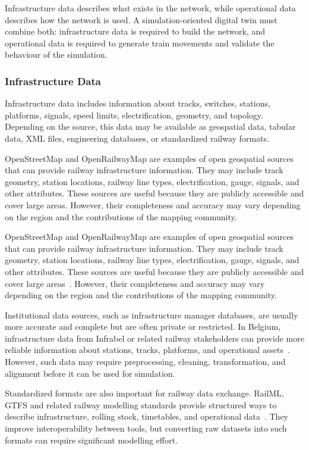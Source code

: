 Infrastructure data describes what exists in the network, while operational data describes how the network is used. A 
simulation-oriented digital twin must combine both: infrastructure data is required to build the network, and operational 
data is required to generate train movements and validate the behaviour of the simulation.

\subsubsection{Infrastructure Data}
Infrastructure data includes information about tracks, switches, stations, platforms, signals, speed limits, 
electrification, geometry, and topology. Depending on the source, this data may be available as geospatial data, tabular 
data, XML files, engineering databases, or standardized railway formats.

OpenStreetMap and OpenRailwayMap are examples of open geospatial sources that can provide railway infrastructure 
information. They may include track geometry, station locations, railway line types, electrification, gauge, signals, and 
other attributes. These sources are useful because they are publicly accessible and cover large areas. However, their 
completeness and accuracy may vary depending on the region and the contributions of the mapping community.

OpenStreetMap and OpenRailwayMap are examples of open geospatial sources that can provide railway infrastructure 
information. They may include track geometry, station locations, railway line types, electrification, gauge, signals, and 
other attributes. These sources are useful because they are publicly accessible and cover large areas~\cite{osm}. However, 
their completeness and accuracy may vary depending on the region and the contributions of the mapping community.

Institutional data sources, such as infrastructure manager databases, are usually more accurate and complete but are often 
private or restricted. In Belgium, infrastructure data from Infrabel or related railway stakeholders can provide more 
reliable information about stations, tracks, platforms, and operational assets~\cite{infrabel_open_data}. However, such 
data may require preprocessing, cleaning, transformation, and alignment before it can be used for simulation.

Standardized formats are also important for railway data exchange. RailML, GTFS and related railway modelling standards 
provide structured ways to describe infrastructure, rolling stock, timetables, and operational data~\cite{railml, gtfs}. 
They improve interoperability between tools, but converting raw datasets into such formats can require significant 
modelling effort.

